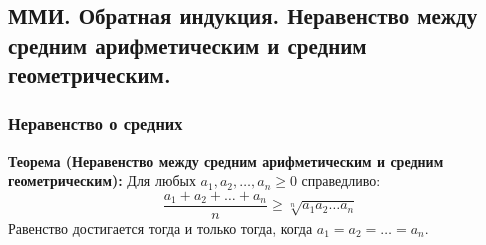 \subsection{ММИ. Обратная индукция. Неравенство между средним арифметическим и средним геометрическим.}

\subsubsection*{Неравенство о средних}
\begin{tcolorbox}
\textbf{Теорема (Неравенство между средним арифметическим и средним геометрическим):}
Для любых $a_1, a_2, \dots, a_n \geq 0$ справедливо:
$$\frac{a_1 + a_2 + \dots + a_n}{n} \geq \sqrt[n]{a_1 a_2 \dots a_n}$$
Равенство достигается тогда и только тогда, когда $a_1 = a_2 = \dots = a_n$.
\end{tcolorbox}


